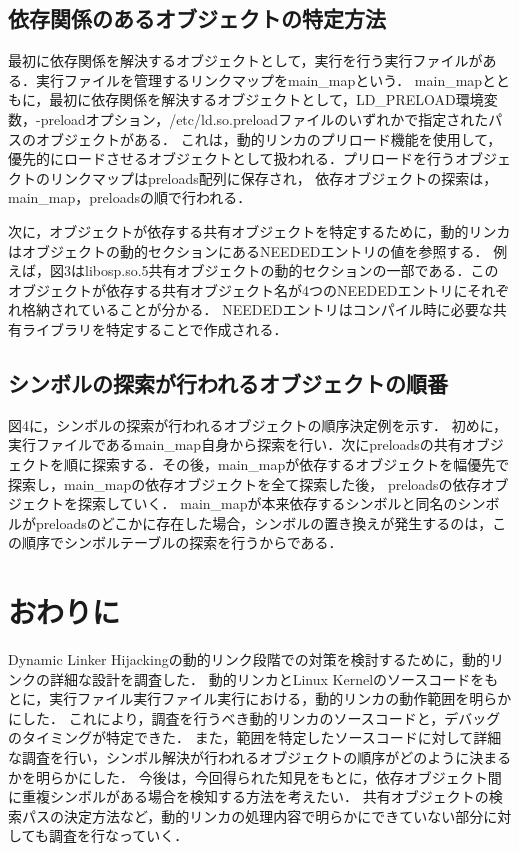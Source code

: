 \documentclass[submit,techreq,noauthor,dvipdfmx]{mid-eco}
\begin{document}
\subsection{依存関係のあるオブジェクトの特定方法}

最初に依存関係を解決するオブジェクトとして，実行を行う実行ファイルがある．実行ファイルを管理するリンクマップをmain\_mapという．
main\_mapとともに，最初に依存関係を解決するオブジェクトとして，LD\_PRELOAD環境変数，-preloadオプション，/etc/ld.so.preloadファイルのいずれかで指定されたパスのオブジェクトがある．
これは，動的リンカのプリロード機能を使用して，優先的にロードさせるオブジェクトとして扱われる．プリロードを行うオブジェクトのリンクマップはpreloads配列に保存され，
依存オブジェクトの探索は，main\_map，preloadsの順で行われる．

次に，オブジェクトが依存する共有オブジェクトを特定するために，動的リンカはオブジェクトの動的セクションにあるNEEDEDエントリの値を参照する．
例えば，図3はlibosp.so.5共有オブジェクトの動的セクションの一部である．このオブジェクトが依存する共有オブジェクト名が4つのNEEDEDエントリにそれぞれ格納されていることが分かる．
NEEDEDエントリはコンパイル時に必要な共有ライブラリを特定することで作成される．


\subsection{シンボルの探索が行われるオブジェクトの順番}
図4に，シンボルの探索が行われるオブジェクトの順序決定例を示す．
初めに，実行ファイルであるmain\_map自身から探索を行い．次にpreloadsの共有オブジェクトを順に探索する．その後，main\_mapが依存するオブジェクトを幅優先で探索し，main\_mapの依存オブジェクトを全て探索した後，
preloadsの依存オブジェクトを探索していく．
main\_mapが本来依存するシンボルと同名のシンボルがpreloadsのどこかに存在した場合，シンボルの置き換えが発生するのは，この順序でシンボルテーブルの探索を行うからである．\\




\section{おわりに}
Dynamic Linker Hijackingの動的リンク段階での対策を検討するために，動的リンクの詳細な設計を調査した．
動的リンカとLinux Kernelのソースコードをもとに，実行ファイル実行ファイル実行における，動的リンカの動作範囲を明らかにした．
これにより，調査を行うべき動的リンカのソースコードと，デバッグのタイミングが特定できた．
また，範囲を特定したソースコードに対して詳細な調査を行い，シンボル解決が行われるオブジェクトの順序がどのように決まるかを明らかにした．
今後は，今回得られた知見をもとに，依存オブジェクト間に重複シンボルがある場合を検知する方法を考えたい．
共有オブジェクトの検索パスの決定方法など，動的リンカの処理内容で明らかにできていない部分に対しても調査を行なっていく．

\setlength\baselineskip{12pt}
{\small
	
	
}
\end{document}
